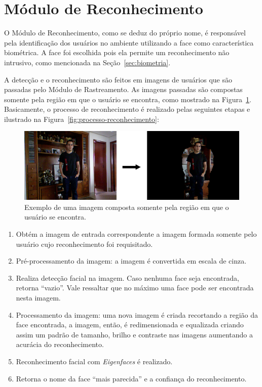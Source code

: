 \section{Módulo de Reconhecimento}

	O Módulo de Reconhecimento, como se deduz do próprio nome, é responsável pela
	identificação dos usuários no ambiente utilizando a face como característica
	biométrica. A face foi escolhida pois ela permite um reconhecimento não
	intrusivo, como mencionada na Seção~\ref{sec:biometria}.

	A detecção e o reconhecimento são feitos em imagens de usuários que são
	passadas pelo Módulo de Rastreamento. As imagens passadas são compostas somente
	pela região em que o usuário se encontra, como mostrado na Figura~\ref{fig:users-img}. Basicamente, o processo de reconhecimento é
	realizado pelas seguintes etapas e ilustrado na Figura~\ref{fig:processo-reconhecimento}:

		\begin{figure}[hbt]
			\begin{center}
				\includegraphics[scale=0.3]{figuras/4.ProblemaEProposta/users-img.png}
			\end{center}
			\caption{Exemplo de uma imagem composta somente pela região em que o usuário se encontra.}
			\label{fig:users-img}
		\end{figure}

		\begin{enumerate}
			\item Obtém a imagem de entrada correspondente a imagem formada somente pelo usuário cujo reconhecimento foi requisitado.
			\item Pré-processamento da imagem: a imagem é convertida em escala de cinza.
			\item Realiza detecção facial na imagem. Caso nenhuma face seja encontrada, retorna ``vazio''. Vale ressaltar que no máximo uma face pode ser encontrada nesta imagem.
			\item Processamento da imagem: uma nova imagem é criada recortando a região da face encontrada, a imagem, então, é redimensionada e equalizada criando assim um padrão de tamanho, brilho e contraste nas imagens aumentando a acurácia do reconhecimento.
			\item Reconhecimento facial com \textit{Eigenfaces} é realizado.
			\item Retorna o nome da face ``mais parecida'' e a confiança do reconhecimento.
		\end{enumerate}

